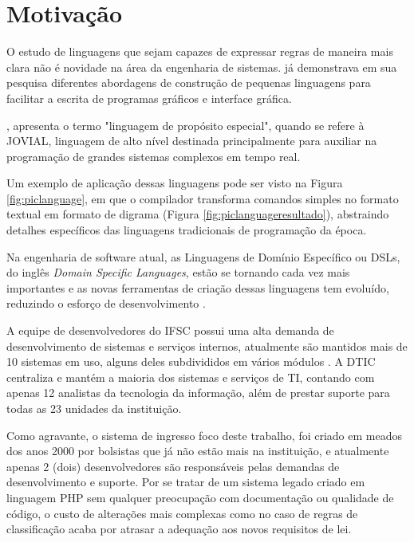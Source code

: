 \section{Motivação}
\label{motivacao}

O estudo de linguagens que sejam capazes de expressar regras de maneira mais clara não é novidade na área da engenharia de sistemas.  já demonstrava em sua pesquisa diferentes abordagens de construção de pequenas linguagens para facilitar a escrita de programas gráficos e interface gráfica.


, apresenta o termo "linguagem de propósito especial", quando se refere à \gls{JOVIAL}, linguagem de alto nível destinada principalmente para auxiliar na programação de grandes sistemas complexos em tempo real. 

Um exemplo de aplicação dessas linguagens pode ser visto na Figura \ref{fig:piclanguage}, em que o compilador transforma comandos simples no formato textual em formato de digrama (Figura \ref{fig:piclanguageresultado}), abstraindo detalhes específicos das linguagens tradicionais de programação da época.




Na engenharia de software atual, as Linguagens de Domínio Específico ou DSLs, do inglês \textit{Domain Specific Languages}, estão se tornando cada vez mais importantes e as novas ferramentas de criação dessas linguagens tem evoluído, reduzindo o esforço de desenvolvimento \cite{dslengineering}.

A equipe de desenvolvedores do \gls{IFSC} possui uma alta demanda de desenvolvimento de sistemas e serviços internos, atualmente são mantidos mais de 10 sistemas em uso, alguns deles subdivididos em vários módulos \cite{catalogoifsc}. A \gls{DTIC} centraliza e mantém a maioria dos sistemas e serviços de TI, contando com apenas 12 analistas da tecnologia da informação, além de prestar suporte para todas as 23 unidades da instituição. 

Como agravante, o sistema de ingresso foco deste trabalho, foi criado em meados dos anos 2000 por bolsistas que já não estão mais na instituição, e atualmente apenas 2 (dois) desenvolvedores são responsáveis pelas demandas de desenvolvimento e suporte. Por se tratar de um sistema legado criado em linguagem PHP sem qualquer preocupação com documentação ou qualidade de código, o custo de alterações mais complexas como no caso de regras de classificação acaba por atrasar a adequação aos novos requisitos de lei. 


